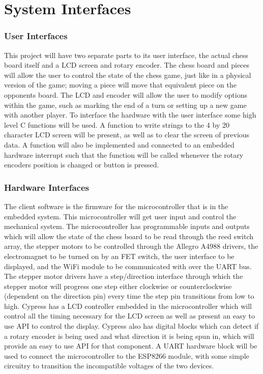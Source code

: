 \documentclass{article}
\begin{document}
\section*{System Interfaces}

\subsubsection*{User Interfaces}
\indent

This project will have two separate parts to its user interface, the actual chess board itself and a LCD screen and rotary encoder. The chess board and pieces will allow the user to control the state of the chess game, just like in a physical version of the game; moving a piece will move that equivalent piece on the opponents board. The LCD and encoder will allow the user to modify options within the game, such as marking the end of a turn or setting up a new game with another player. To interface the hardware with the user interface some high level C functions will be used. A function to write strings to the 4 by 20 character LCD screen will be present, as well as to clear the screen of previous data. A function will also be implemented and connected to an embedded hardware interrupt such that the function will be called whenever the rotary encoders position is changed or button is pressed.

\subsubsection*{Hardware Interfaces}
\indent

The client software is the firmware for the microcontroller that is in the embedded system. This microcontroller will get user input and control the mechanical system. The microcontroller has programmable inputs and outputs which will allow the state of the chess board to be read through the reed switch array, the stepper motors to be controlled through the Allegro A4988 drivers, the electromagnet to be turned on by an FET switch, the user interface to be displayed, and the WiFi module to be communicated with over the UART bus. The stepper motor drivers have a step/direction interface through which the stepper motor will progress one step either clockwise or counterclockwise (dependent on the direction pin) every time the step pin transitions from low to high. Cypress has a LCD controller embedded in the microcontroller which will control all the timing necessary for the LCD screen as well as present an easy to use API to control the display. Cypress also has digital blocks which can detect if a rotary encoder is being used and what direction it is being spun in, which will provide an easy to use API for that component. A UART hardware block will be used to connect the microcontroller to the ESP8266 module, with some simple circuitry to transition the incompatible voltages of the two devices.
\end{document}
